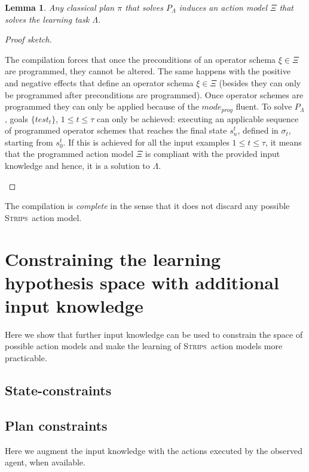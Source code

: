 \documentclass{article}
\newcommand{\strips}{\textsc{Strips}}     %
\newtheorem{lemma}[theorem]{Lemma}
\begin{document}
\begin{lemma}
Any classical plan $\pi$ that solves $P_{\Lambda}$ induces an action model $\Xi$ that solves the learning task $\Lambda$.
\end{lemma}

\begin{proof}[Proof sketch]
\begin{small}
The compilation forces that once the preconditions of an operator schema $\xi \in \Xi$ are programmed, they cannot be altered. The same happens with the positive and negative effects that define an operator schema $\xi \in \Xi$ (besides they can only be programmed after preconditions are programmed). Once operator schemes are programmed they can only be applied because of the $mode_{prog}$ fluent. To solve $P_{\Lambda}$, goals $\{test_t\}$, {\small $1\leq t\leq \tau$} can only be achieved: executing an applicable sequence of programmed operator schemes that reaches the final state $s_n^t$, defined in $\sigma_t$, starting from $s_0^t$. If this is achieved for all the input examples {\small $1\leq t\leq \tau$}, it means that the programmed action model $\Xi$ is compliant with the provided input knowledge and hence, it is a solution to $\Lambda$.
\end{small}
\end{proof}

The compilation is {\em complete} in the sense that it does not discard any possible \strips\ action model.


\section{Constraining the learning hypothesis space with additional input knowledge}
\label{sec:Constraining}
Here we show that further input knowledge can be used to constrain the space of possible action models and make the learning of \strips\ action models more practicable.

\subsection{State-constraints}

\subsection{Plan constraints}

Here we augment the input knowledge with the actions executed by the observed agent, when available.
\end{document}
